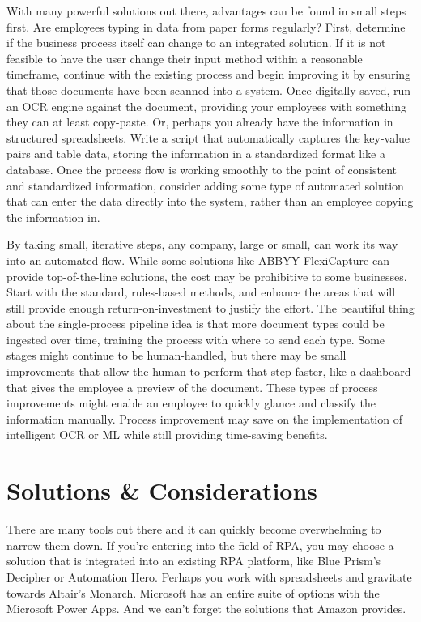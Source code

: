 \documentclass[conference]{IEEEtran}
\begin{document}
With many powerful solutions out there, advantages can be found in small steps first. Are employees typing in data from paper forms regularly? First, determine if the business process itself can change to an integrated solution. If it is not feasible to have the user change their input method within a reasonable timeframe, continue with the existing process and begin improving it by ensuring that those documents have been scanned into a system. Once digitally saved, run an OCR engine against the document, providing your employees with something they can at least copy-paste. Or, perhaps you already have the information in structured spreadsheets. Write a script that automatically captures the key-value pairs and table data, storing the information in a standardized format like a database. Once the process flow is working smoothly to the point of consistent and standardized information, consider adding some type of automated solution that can enter the data directly into the system, rather than an employee copying the information in.

By taking small, iterative steps, any company, large or small, can work its way into an automated flow. While some solutions like ABBYY FlexiCapture can provide top-of-the-line solutions, the cost may be prohibitive to some businesses. Start with the standard, rules-based methods, and enhance the areas that will still provide enough return-on-investment to justify the effort. The beautiful thing about the single-process pipeline idea is that more document types could be ingested over time, training the process with where to send each type. Some stages might continue to be human-handled, but there may be small improvements that allow the human to perform that step faster, like a dashboard that gives the employee a preview of the document. These types of process improvements might enable an employee to quickly glance and classify the information manually. Process improvement may save on the implementation of intelligent OCR or ML while still providing time-saving benefits.

\section{Solutions \& Considerations} \label{sectionCosts}
There are many tools out there and it can quickly become overwhelming to narrow them down. If you're entering into the field of RPA, you may choose a solution that is integrated into an existing RPA platform, like Blue Prism's Decipher or Automation Hero. Perhaps you work with spreadsheets and gravitate towards Altair's Monarch. Microsoft has an entire suite of options with the Microsoft Power Apps. And we can't forget the solutions that Amazon provides.
\end{document}
